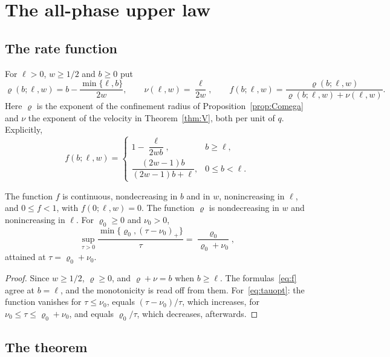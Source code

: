 \section{The all-phase upper law}\label{sec:upperlaw}

\subsection{The rate function}

For $\ell>0$, $w\ge1/2$ and $b\ge0$ put
\[
\varrho(b;\ell,w)=b-\frac{\min\{\ell,b\}}{2w},\qquad\nu(\ell,w)=\frac\ell{2w},\qquad f(b;\ell,w)=\frac{\varrho(b;\ell,w)}{\varrho(b;\ell,w)+\nu(\ell,w)} .
\]
Here $\varrho$ is the exponent of the confinement radius of Proposition~\ref{prop:Comega} and $\nu$ the exponent of the velocity in Theorem~\ref{thm:V}, both per unit of $q$. Explicitly,
\begin{equation}\label{eq:f}
f(b;\ell,w)=\begin{cases}1-\dfrac{\ell}{2wb},&b\ge\ell,\\[2mm]\dfrac{(2w-1)b}{(2w-1)b+\ell},&0\le b<\ell.\end{cases}
\end{equation}

\begin{lemma}\label{lem:f}
The function $f$ is continuous, nondecreasing in $b$ and in $w$, nonincreasing in $\ell$, and $0\le f<1$, with $f(0;\ell,w)=0$. The function $\varrho$ is nondecreasing in $w$ and nonincreasing in $\ell$. For $\varrho_0\ge0$ and $\nu_0>0$,
\begin{equation}\label{eq:tauopt}
\sup_{\tau>0}\frac{\min\{\varrho_0,(\tau-\nu_0)_+\}}{\tau}=\frac{\varrho_0}{\varrho_0+\nu_0},
\end{equation}
attained at $\tau=\varrho_0+\nu_0$.
\end{lemma}

\begin{proof}
Since $w\ge1/2$, $\varrho\ge0$, and $\varrho+\nu=b$ when $b\ge\ell$. The formulas~\eqref{eq:f} agree at $b=\ell$, and the monotonicity is read off from them. For~\eqref{eq:tauopt}: the function vanishes for $\tau\le\nu_0$, equals $(\tau-\nu_0)/\tau$, which increases, for $\nu_0\le\tau\le\varrho_0+\nu_0$, and equals $\varrho_0/\tau$, which decreases, afterwards.
\end{proof}

\subsection{The theorem}

